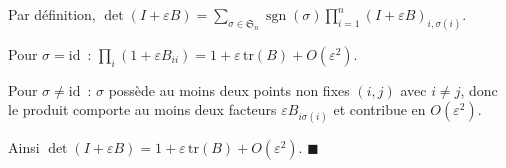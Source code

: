 \begin{mdframed}[style=proofbar]
  Par définition, $\det(I + \varepsilon B) = \sum_{\sigma \in \mathfrak{S}_n}
  \operatorname{sgn}(\sigma)\prod_{i=1}^n (I+\varepsilon B)_{i,\sigma(i)}$.

  Pour $\sigma = \mathrm{id}$~: $\prod_i(1 + \varepsilon B_{ii})
  = 1 + \varepsilon\,\mathrm{tr}(B) + O(\varepsilon^2)$.

  Pour $\sigma \neq \mathrm{id}$~: $\sigma$ possède au moins deux points non fixes
  $(i,j)$ avec $i \neq j$, donc le produit comporte au moins deux facteurs
  $\varepsilon B_{i\sigma(i)}$ et contribue en $O(\varepsilon^2)$.

  Ainsi $\det(I + \varepsilon B) = 1 + \varepsilon\,\mathrm{tr}(B) + O(\varepsilon^2)$.
  \hfill$\blacksquare$
\end{mdframed}

\decsep{}


